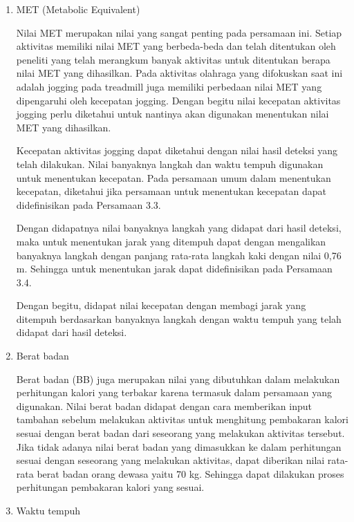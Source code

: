 \begin{enumerate} [label=\textbf{\arabic*}., listparindent=2em]
  \begin{enumerate}[label=\textbf{\alph*}., listparindent=2em]
    \item MET (Metabolic Equivalent)
    
    Nilai MET merupakan nilai yang sangat penting pada persamaan ini. Setiap aktivitas memiliki nilai MET yang berbeda-beda dan telah ditentukan oleh peneliti yang telah merangkum banyak aktivitas untuk ditentukan berapa nilai MET yang dihasilkan. Pada aktivitas olahraga yang difokuskan saat ini adalah jogging pada treadmill juga memiliki perbedaan nilai MET yang dipengaruhi oleh kecepatan jogging. Dengan begitu nilai kecepatan aktivitas jogging perlu diketahui untuk nantinya akan digunakan menentukan nilai MET yang dihasilkan.

    Kecepatan aktivitas jogging dapat diketahui dengan nilai hasil deteksi yang telah dilakukan. Nilai banyaknya langkah dan waktu tempuh digunakan untuk menentukan kecepatan. Pada persamaan umum dalam menentukan kecepatan, diketahui jika persamaan untuk menentukan kecepatan dapat didefinisikan pada Persamaan 3.3.


    Dengan didapatnya nilai banyaknya langkah yang didapat dari hasil deteksi, maka untuk menentukan jarak yang ditempuh dapat dengan mengalikan banyaknya langkah dengan panjang rata-rata langkah kaki dengan nilai 0,76 m. Sehingga untuk menentukan jarak dapat didefinisikan pada Persamaan 3.4.


    Dengan begitu, didapat nilai kecepatan dengan membagi jarak yang ditempuh berdasarkan banyaknya langkah dengan waktu tempuh yang telah didapat dari hasil deteksi.

    \item Berat badan
    
    Berat badan (BB) juga merupakan nilai yang dibutuhkan dalam melakukan perhitungan kalori yang terbakar karena termasuk dalam persamaan yang digunakan. Nilai berat badan didapat dengan cara memberikan input tambahan sebelum melakukan aktivitas untuk menghitung pembakaran kalori sesuai dengan berat badan dari seseorang yang melakukan aktivitas tersebut. Jika tidak adanya nilai berat badan yang dimasukkan ke dalam perhitungan sesuai dengan seseorang yang melakukan aktivitas, dapat diberikan nilai rata-rata berat badan orang dewasa yaitu 70 kg. Sehingga dapat dilakukan proses perhitungan pembakaran kalori yang sesuai.

    \item Waktu tempuh
  \end{enumerate}



\end{enumerate}
